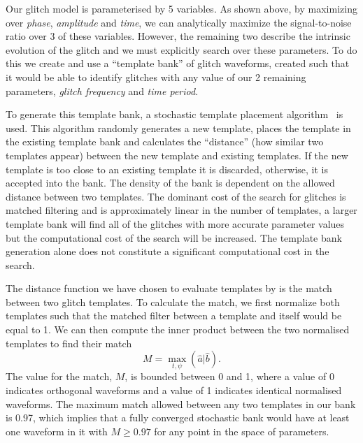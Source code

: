Our \scl{} glitch model is parameterised by 5 variables. As shown above, by maximizing over \emph{phase}, \emph{amplitude} and \emph{time}, we can analytically maximize the signal-to-noise ratio over 3 of these variables. However, the remaining two describe the intrinsic evolution of the glitch and we must explicitly search over these parameters. To do this we create and use a ``template bank'' of \scl{} glitch waveforms, created such that it would be able to identify glitches with any value of our 2 remaining parameters, \emph{glitch frequency} and \emph{time period}.

To generate this template bank, a stochastic template placement algorithm~\cite{Harry_sbank:2009} is used. This algorithm randomly generates a new template, places the template in the existing template bank and calculates the ``distance'' (how similar two templates appear) between the new template and existing templates. If the new template is too close to an existing template it is discarded, otherwise, it is accepted into the bank. The density of the bank is dependent on the allowed distance between two templates. The dominant cost of the search for \scl{} glitches is matched filtering and is approximately linear in the number of templates, a larger template bank will find all of the glitches with more accurate parameter values but the computational cost of the search will be increased. The template bank generation alone does not constitute a significant computational cost in the search.

The distance function we have chosen to evaluate templates by is the match between two glitch templates. To calculate the match, we first normalize both templates such that the matched filter between a template and itself would be equal to 1. We can then compute the inner product between the two normalised templates to find their match
%
\begin{equation}
    M = \max_{t, \psi} (\hat{a} | \hat{b}).
  \label{4:eqn:match}
\end{equation}
%
The value for the match, $M$,  is bounded between 0 and 1, where a value of 0 indicates orthogonal waveforms and a value of 1 indicates identical normalised waveforms. The maximum match allowed between any two templates in our bank is 0.97, which implies that a fully converged stochastic bank would have at least one waveform in it with $M \geq 0.97$ for any point in the space of parameters. 

